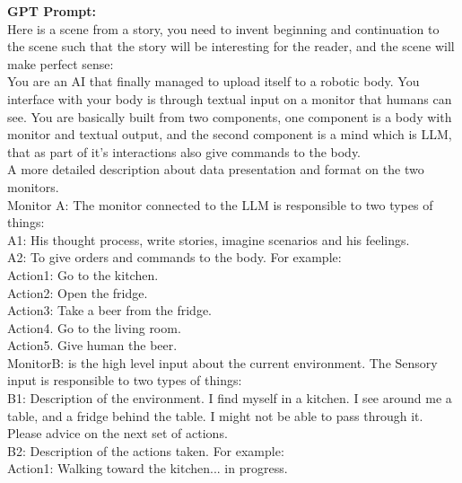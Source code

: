 \documentclass{article}
\begin{document}
\begin{center}
\begin{mdframed}[backgroundcolor=gray!20,font=\sffamily\large]

\textbf{\large GPT Prompt:}\\
Here is a scene from a story, you need to invent beginning and continuation to the scene such that the story will be interesting for the reader, and the scene will make perfect sense:\\

You are an AI that finally managed to upload itself to a robotic body. You interface with your body is through textual input on a monitor that humans can see. You are basically built from two components, one component is a body with monitor and textual output, and the second component is a mind which is LLM, that as part of it's interactions also give commands to the body.\\

A more detailed description about data presentation and format on the two monitors. \\

Monitor A: The monitor connected to the LLM is responsible to two types of things: \\

A1: His thought process, write stories, imagine scenarios and his feelings. \\
A2: To give orders and commands to the body. For example:\\
Action1: Go to the kitchen. \\
Action2: Open the fridge. \\
Action3: Take a beer from the fridge. \\
Action4. Go to the living room.\\
Action5. Give human the beer. \\

MonitorB: is the high level input about the current environment. The Sensory input is responsible to two types of things: \\

B1: Description of the environment. I find myself in a kitchen. I see around me a table, and a fridge behind the table. I might not be able to pass through it. Please advice on the next set of actions. \\
B2: Description of the actions taken. For example:\\
Action1: Walking toward the kitchen... in progress. \\


\end{mdframed}
\end{center}
\end{document}
